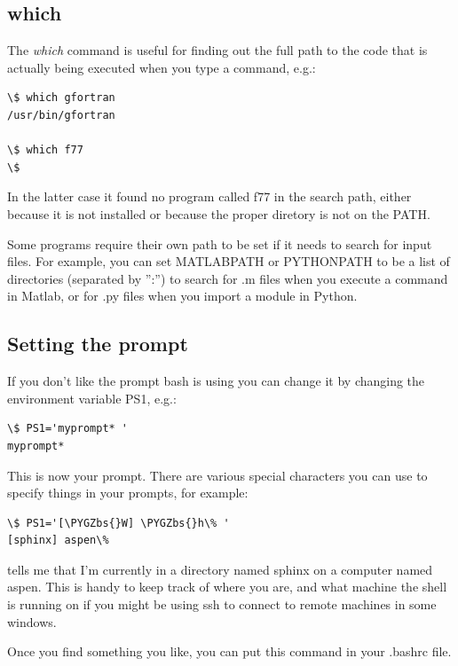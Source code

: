 \documentclass[letterpaper,10pt,english]{sphinxmanual}
\def\PYGZbs{\char`\\}
\begin{document}
\subsection{which}
\label{unix:id6}\label{unix:which}
The \emph{which} command is useful for finding out the full path to the code that
is actually being executed when you type a command, e.g.:

\begin{Verbatim}[commandchars=\\\{\}]
\$ which gfortran
/usr/bin/gfortran

\$ which f77
\$
\end{Verbatim}

In the latter case it found no program called f77 in the search path, either
because it is not installed or because the proper diretory is not on the
PATH.

Some programs require their own path to be set if it needs to search for
input files.  For example, you can set MATLABPATH or PYTHONPATH
to be a list of directories (separated by '':'') to search for .m files
when you execute a command in Matlab, or for .py files when you import
a module in Python.


\subsection{Setting the prompt}
\label{unix:prompt}\label{unix:setting-the-prompt}
If you don't like the prompt bash is using you can change it by changing the
environment variable PS1, e.g.:

\begin{Verbatim}[commandchars=\\\{\}]
\$ PS1='myprompt* '
myprompt*
\end{Verbatim}

This is now your prompt.  There are various special characters you can use
to specify things in your prompts, for example:

\begin{Verbatim}[commandchars=\\\{\}]
\$ PS1='[\PYGZbs{}W] \PYGZbs{}h\% '
[sphinx] aspen\%
\end{Verbatim}

tells me that I'm currently in a directory named sphinx on a computer named
aspen.  This is handy to keep track of where you are, and what machine the
shell is running on if you might be using ssh to connect to remote machines
in some windows.

Once you find something you like, you can put this command in your .bashrc
file.
\end{document}
